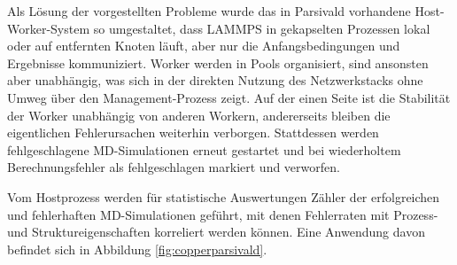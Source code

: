 Als Lösung der vorgestellten Probleme wurde das in Parsivald vorhandene Host-Worker-System so umgestaltet, dass LAMMPS in gekapselten Prozessen lokal oder auf entfernten Knoten läuft, aber nur die Anfangsbedingungen und Ergebnisse kommuniziert.
Worker werden in Pools organisiert, sind ansonsten aber unabhängig, was sich in der direkten Nutzung des Netzwerkstacks ohne Umweg über den Management-Prozess zeigt.
Auf der einen Seite ist die Stabilität der Worker unabhängig von anderen Workern, andererseits bleiben die eigentlichen Fehlerursachen weiterhin verborgen.
Stattdessen werden fehlgeschlagene MD-Simulationen erneut gestartet und bei wiederholtem Berechnungsfehler als fehlgeschlagen markiert und verworfen.

Vom Hostprozess werden für statistische Auswertungen Zähler der erfolgreichen und fehlerhaften MD-Simulationen geführt, mit denen Fehlerraten mit Prozess- und Struktureigenschaften korreliert werden können.
Eine Anwendung davon befindet sich in Abbildung \ref{fig:copperparsivald}.
